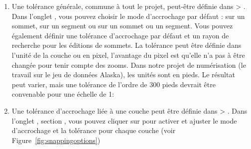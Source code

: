 \begin{enumerate}
\item Une tolérance générale, commune à tout le projet, peut-être définie dans  > . Dans l'onglet , vous pouvez choisir le mode d'accrochage par défaut : sur un sommet, sur un segment ou sur un sommet ou un segment. Vous pouvez également définir une tolérance d'accrochage par défaut et un rayon de recherche pour les éditions de sommets. La tolérance peut être définie dans l'unité de la couche ou en pixel, l'avantage du pixel est qu'elle n'a pas à être changée pour tenir compte des zooms. 
Dans notre projet de numérisation (le travail sur le jeu de données Alaska), les unités sont en pieds. Le résultat peut varier, mais une tolérance de l'ordre de 300 pieds devrait être convenable pour une échelle de 1:\ieme
\item Une tolérance d'accrochage liée à une couche peut être définie dans  > . Dans l'onglet , section , vous pouvez cliquer sur  pour activer et ajuster le mode d'accrochage et la tolérance pour chaque couche  (voir Figure~\ref{fig:snappingoptions})
\end{enumerate}


